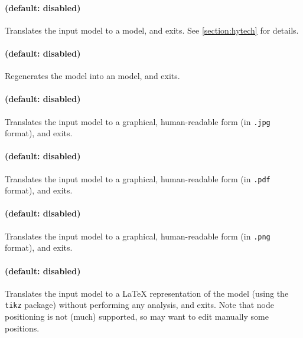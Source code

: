 \paragraph{ (default: disabled)}
Translates the input model to a \hytech{} model, and exits.
See \cref{section:hytech} for details.

\paragraph{ (default: disabled)}
Regenerates the model into an \imitator{} model, and exits.

\paragraph{ (default: disabled)}
Translates the input model to a graphical, human-readable form (in \texttt{.jpg} format), and exits.

\paragraph{ (default: disabled)}
Translates the input model to a graphical, human-readable form (in \texttt{.pdf} format), and exits.

\paragraph{ (default: disabled)}
Translates the input model to a graphical, human-readable form (in \texttt{.png} format), and exits.

\paragraph{ (default: disabled)}
Translates the input model to a \LaTeX{} representation of the model (using the \texttt{tikz} package) without performing any analysis, and exits.
Note that node positioning is not (much) supported, so may want to edit manually some positions.

